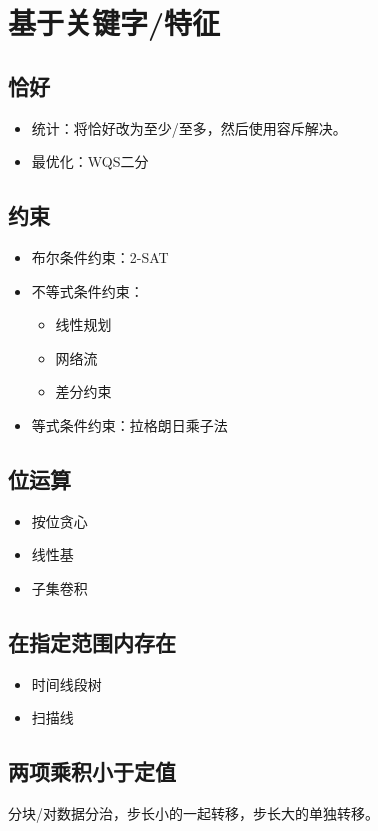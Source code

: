 \section{基于关键字/特征}
\subsection{恰好}
\begin{itemize}
    \item 统计：将恰好改为至少/至多，然后使用容斥解决。
    \item 最优化：WQS二分
\end{itemize}
\subsection{约束}
\begin{itemize}
    \item 布尔条件约束：2-SAT
    \item 不等式条件约束：
    \begin{itemize}
        \item 线性规划
        \item 网络流
        \item 差分约束
    \end{itemize}
    \item 等式条件约束：拉格朗日乘子法
\end{itemize}
\subsection{位运算}
\begin{itemize}
    \item 按位贪心
    \item 线性基
    \item 子集卷积
\end{itemize}
\subsection{在指定范围内存在}
\begin{itemize}
    \item 时间线段树
    \item 扫描线
\end{itemize}
\subsection{两项乘积小于定值}
分块/对数据分治，步长小的一起转移，步长大的单独转移。
